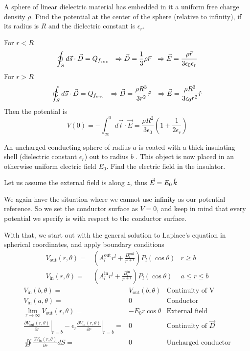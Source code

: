 \documentclass[../main.tex]{subfiles}
\begin{document}
\begin{questions}
\question A sphere of linear dielectric material has embedded in it a uniform free charge density $\rho$. Find the potential at the center of the sphere (relative to infinity), if its radius is $R$ and the dielectric constant is $\epsilon_r$.
\begin{solution}
	For $r<R$
	$$\oint_S d\vec{s}\cdot\vec{D}=Q_{f_{enc}} \hspace{0.1in} \Rightarrow\vec{D}=\frac{1}{3}\rho\vec{r} \hspace{0.1in} \Rightarrow\vec{E}=\frac{\rho\vec{r}}{3\epsilon_{0}\epsilon_{r}}$$
	For $r>R$
	$$\oint_S d\vec{s}\cdot\vec{D}=Q_{f_{enc}} \hspace{0.1in} \Rightarrow\vec{D}=\frac{\rho R^3}{3r^2}\hat{r} \hspace{0.1in} \Rightarrow\vec{E}=\frac{\rho R^3}{3\epsilon_{0}r^2}\hat{r}$$
	Then the potential is
	$$V(0)=-\int_{\infty}^0d\vec{l}\cdot\vec{E}=\frac{\rho R^2}{3\epsilon_{0}}\left(1+\frac{1}{2\epsilon_r}\right) $$
\end{solution}

\question An uncharged conducting sphere of radius $a$ is coated with a thick insulating shell (dielectric constant $\epsilon_r$) out to radius $b$ . This object is now
placed in an otherwise uniform electric field $E_0$. Find the electric field in the insulator.
\begin{solution}
	Let us assume the external field is along $z$, thus $\vec{E}=E_0\,\hat{k}$

	We again have the situation where we cannot use infinity as our potential reference. So we set the conductor surface as $V=0$, and keep in mind that every potential we specify is with respect to the conductor surface.

	With that, we start out with the general solution to Laplace's equation in spherical coordinates, and apply boundary conditions
	\begin{eqnarray}
		V_\text{out}(r,\theta) =& \left(A^\text{out}_lr^l+\frac{B^\text{out}_l}{r^{l+1}}\right)P_l(\cos\theta) & r \geq b
		\\
		V_\text{in}(r,\theta) =& \left(A^\text{in}_lr^l+\frac{B^\text{in}_l}{r^{l+1}}\right)P_l(\cos\theta) & a \leq r \leq b
	\end{eqnarray}
	\begin{eqnarray}
		V_\text{in}(b,\theta) =& V_\text{out}(b,\theta)
		& \text{Continuity of V} \label{eq:ebc1}
		\\
		V_\text{in}(a,\theta) =& 0
		& \text{Conductor} \label{eq:ebc2}
		\\
		\lim_{r\to\infty} V_\text{out}(r,\theta) =& -E_0r\cos\theta & \text{External field} \label{eq:ebc3}
		\\
		\left.\frac{\partial V_\text{out}(r,\theta)}{\partial r}\right|_{r=b} - \epsilon_r \left.\frac{\partial V_\text{in}(r,\theta)}{\partial r}\right|_{r=b} =& 0 & \text{Continuity of $\vec{D}$} \label{eq:ebc4}
		\\
		\oiint \frac{\partial V_\text{in}(r,\theta)}{\partial r} dS =& 0 & \text{Uncharged conductor} \label{eq:ebc5}
	\end{eqnarray}


\end{solution}
\end{questions}
\end{document}
